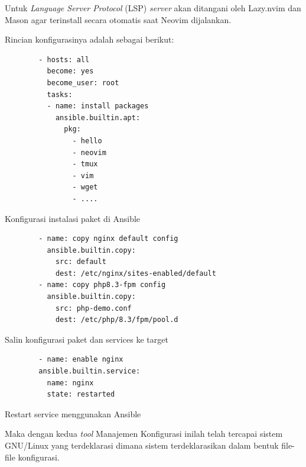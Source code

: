 \documentclass[10pt,twoside]{report}
\newenvironment{code}{\captionsetup{type=listing}}{\vspace{3mm}}
\begin{document}
\begin{adjustwidth}{20pt}{}
\begin{adjustwidth}{20pt}{}
		Untuk \textit{Language Server Protocol} (LSP) \textit{server} akan
		ditangani oleh Lazy.nvim dan Mason agar terinstall secara otomatis
		saat Neovim dijalankan.

		Rincian konfigurasinya adalah sebagai berikut:

		\begin{code}
			\begin{verbatim}
        - hosts: all
          become: yes
          become_user: root
          tasks:
          - name: install packages
            ansible.builtin.apt:
              pkg:
                - hello
                - neovim
                - tmux
                - vim
                - wget
                - ....
      \end{verbatim}
			\caption{Konfigurasi instalasi paket di Ansible}
		\end{code}

		\begin{code}
			\begin{verbatim}
        - name: copy nginx default config
          ansible.builtin.copy:
            src: default
            dest: /etc/nginx/sites-enabled/default
        - name: copy php8.3-fpm config
          ansible.builtin.copy:
            src: php-demo.conf
            dest: /etc/php/8.3/fpm/pool.d
      \end{verbatim}
			\caption{Salin konfigurasi paket dan services ke target}
		\end{code}

		\begin{code}
			\begin{verbatim}
        - name: enable nginx
        ansible.builtin.service:
          name: nginx
          state: restarted
      \end{verbatim}
			\caption{Restart service menggunakan Ansible}
		\end{code}

		Maka dengan kedua \textit{tool} Manajemen Konfigurasi inilah telah tercapai sistem
		GNU/Linux yang terdeklarasi dimana sistem terdeklarasikan dalam bentuk
		file-file konfigurasi.
	\end{adjustwidth}
\end{adjustwidth}
\newpage
\end{document}
